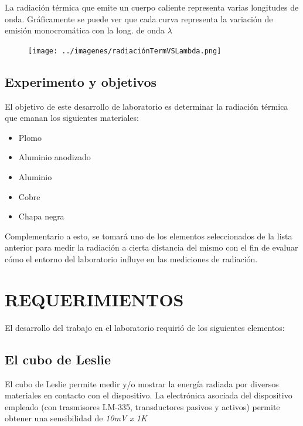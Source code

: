 \documentclass[a4paper]{article}
\begin{document}
            \indent La radiación térmica que emite un cuerpo caliente representa varias longitudes de onda. Gráficamente se puede ver que cada curva representa la variación de emisión monocromática con la long. de onda $\lambda$ \\

			\begin{figure}[h!]
				\centering
				 \texttt{[image: ../imagenes/radiaciónTermVSLambda.png]}
			\end{figure}

        \subsection{Experimento y objetivos}
            \indent El objetivo de este desarrollo de laboratorio es determinar la radiación térmica que emanan los siguientes materiales: \\
            \vspace{-5mm}            
            \begin{itemize}
                \setlength{\itemsep}{0pt}
                \item Plomo 
                \item Aluminio anodizado
                \item Aluminio
                \item Cobre 
                \item Chapa negra
            \end{itemize}
        
            \indent Complementario a esto, se tomará uno de los elementos seleccionados de la lista anterior para medir la radiación a cierta distancia del mismo con el fin de evaluar cómo el entorno del laboratorio influye en las mediciones de radiación. \\


     \section{REQUERIMIENTOS}
        El desarrollo del trabajo en el laboratorio requirió de los siguientes elementos:
        \subsection{El cubo de Leslie}
            \indent El cubo de Leslie permite medir y/o mostrar la energía radiada por diversos materiales en contacto con el dispositivo. 
            \newpage
            \noindent
            \indent La electrónica asociada del dispositivo empleado (con trasmisores LM-335, transductores pasivos y activos) permite obtener una sensibilidad de \textit{10mV x 1\textdegree K} \\
\end{document}
